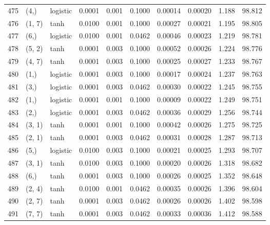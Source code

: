 \begin{tabular}{lllrrrrrrr}
475 &        (4,) &  logistic &  0.0001 &  0.001 &  0.1000 &          0.00014 &    0.00020 &       1.188 &    98.812 \\
476 &      (1, 7) &      tanh &  0.0100 &  0.001 &  0.1000 &          0.00027 &    0.00021 &       1.195 &    98.805 \\
477 &        (6,) &  logistic &  0.0100 &  0.001 &  0.0462 &          0.00046 &    0.00023 &       1.219 &    98.781 \\
478 &      (5, 2) &      tanh &  0.0001 &  0.003 &  0.1000 &          0.00052 &    0.00026 &       1.224 &    98.776 \\
479 &      (4, 7) &      tanh &  0.0001 &  0.003 &  0.1000 &          0.00025 &    0.00027 &       1.233 &    98.767 \\
480 &        (1,) &  logistic &  0.0001 &  0.003 &  0.1000 &          0.00017 &    0.00024 &       1.237 &    98.763 \\
481 &        (3,) &  logistic &  0.0001 &  0.003 &  0.0462 &          0.00030 &    0.00022 &       1.245 &    98.755 \\
482 &        (1,) &  logistic &  0.0001 &  0.001 &  0.1000 &          0.00009 &    0.00022 &       1.249 &    98.751 \\
483 &        (2,) &  logistic &  0.0001 &  0.003 &  0.0462 &          0.00036 &    0.00029 &       1.256 &    98.744 \\
484 &      (3, 1) &      tanh &  0.0001 &  0.001 &  0.1000 &          0.00042 &    0.00026 &       1.275 &    98.725 \\
485 &      (2, 1) &      tanh &  0.0001 &  0.003 &  0.0462 &          0.00031 &    0.00028 &       1.287 &    98.713 \\
486 &        (5,) &  logistic &  0.0100 &  0.003 &  0.1000 &          0.00021 &    0.00025 &       1.293 &    98.707 \\
487 &      (3, 1) &      tanh &  0.0100 &  0.003 &  0.1000 &          0.00020 &    0.00026 &       1.318 &    98.682 \\
488 &        (6,) &      tanh &  0.0001 &  0.003 &  0.1000 &          0.00026 &    0.00025 &       1.352 &    98.648 \\
489 &      (2, 4) &      tanh &  0.0100 &  0.001 &  0.0462 &          0.00035 &    0.00026 &       1.396 &    98.604 \\
490 &      (2, 7) &      tanh &  0.0001 &  0.003 &  0.0462 &          0.00026 &    0.00026 &       1.402 &    98.598 \\
491 &      (7, 7) &      tanh &  0.0001 &  0.003 &  0.0462 &          0.00033 &    0.00036 &       1.412 &    98.588 \\

\end{tabular}
